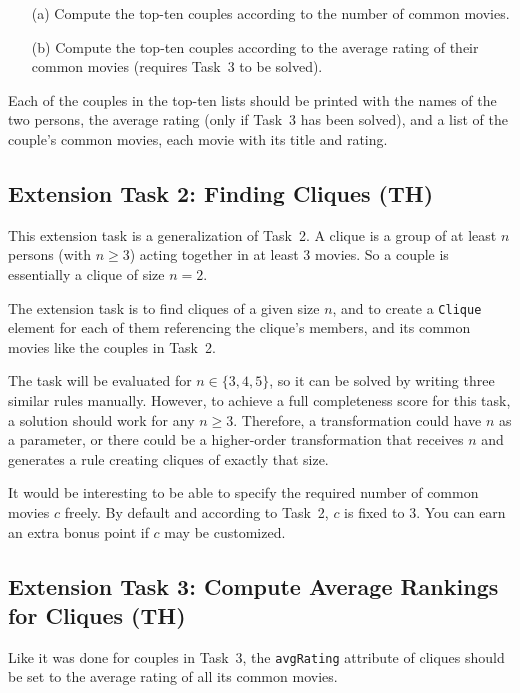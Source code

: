 \documentclass[a4paper,11pt]{article}
\begin{document}
\begin{enumerate}
\item[(a)] Compute the top-ten couples according to the number of common movies.
\item[(b)] Compute the top-ten couples according to the average rating of their
  common movies (requires Task~3 to be solved).
\end{enumerate}

Each of the couples in the top-ten lists should be printed with the names of
the two persons, the average rating (only if Task~3 has been solved), and a
list of the couple's common movies, each movie with its title and rating.

\subsection{Extension Task 2: Finding Cliques (TH)}

This extension task is a generalization of Task~2.  A clique is a group of at
least \(n\) persons (with \(n \geq 3\)) acting together in at least 3 movies.
So a couple is essentially a clique of size \(n = 2\).

The extension task is to find cliques of a given size \(n\), and to create a
\verb|Clique| element for each of them referencing the clique's members, and
its common movies like the couples in Task~2.

The task will be evaluated for \(n \in \{3, 4, 5\}\), so it can be solved by
writing three similar rules manually.  However, to achieve a full completeness
score for this task, a solution should work for any \(n \geq 3\).  Therefore, a
transformation could have \(n\) as a parameter, or there could be a
higher-order transformation that receives \(n\) and generates a rule creating
cliques of exactly that size.

It would be interesting to be able to specify the required number of common
movies \(c\) freely.  By default and according to Task~2, \(c\) is fixed to 3.
You can earn an extra bonus point if \(c\) may be customized.


\subsection{Extension Task 3: Compute Average Rankings for Cliques (TH)}

Like it was done for couples in Task~3, the \verb|avgRating| attribute of
cliques should be set to the average rating of all its common movies.
\end{document}
